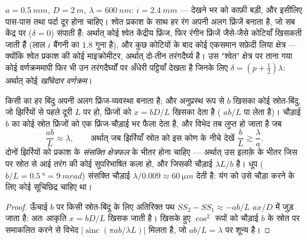 \begin{example}[आँकड़े, और श्वेत प्रकाश]\label{ex:b2:two-wave-interference:numbers}
$a = \qty{0.5}{mm}$, $D = \qty{2}{m}$, $\lambda = \qty{600}{nm}$: $i = \qty{2.4}{mm}$ --- देखने भर
को काफ़ी बड़ी, और इसीलिए  पास-पास तथा पर्दा
दूर होना चाहिए। श्वेत प्रकाश के साथ हर रंग अपनी अलग फ्रिंजें बनाता है, जो सब
केंद्र पर ($\delta = 0$) संपाती हैं: अर्थात् कोई श्वेत केंद्रीय फ्रिंज, फिर
रंगीन फ्रिंजें जैसे-जैसे कोटियाँ खिसकती जाती हैं (लाल $i$ बैंगनी का $1.8$ गुना
है), और कुछ कोटियों के बाद कोई एकसमान सफ़ेदी लिया क्षेत्र --- क्योंकि
श्वेत प्रकाश की  कोई माइक्रोमीटर, अर्थात् दो-तीन
तरंगदैर्घ्य है। उस "श्वेत" क्षेत्र पर ताना गया कोई वर्णक्रममापी फिर भी
उन तरंगदैर्घ्यों पर अँधेरी पट्टियाँ देखता है जिनके लिए $\delta = (p + \tfrac12)\lambda$: अर्थात् कोई
\emph{खाँचेदार वर्णक्रम}।
\end{example}

\begin{proposition}[दैशिक संसक्ति: स्रोत छोटा होना चाहिए]\label{prop:b2:two-wave-interference:spatial}
किसी  का हर बिंदु अपनी अलग फ्रिंज-व्यवस्था बनाता है; और
अनुप्रस्थ रूप से $b$ खिसका कोई स्रोत-बिंदु, जो झिर्रियों से पहले दूरी $L$ पर हो,
फ्रिंजों को $x = bD/L$ खिसका देता है (
$ab/L$ पा लेता है)। चौड़ाई $b$ का कोई स्रोत फ्रिंजों को एक फ्रिंज-चौड़ाई भर फैला देता है,
और विभेद तब लुप्त हो जाता है जब
\[
\frac{ab}L \approx \lambda , \qquad\text{अर्थात् जब झिर्रियाँ स्रोत को इस कोण के नीचे देखें } \frac bL \gtrsim \frac\lambda a .
\]
दोनों झिर्रियों को प्रकाश के \emph{संसक्ति क्षेत्रफल} के भीतर होना चाहिए ---
अर्थात् उस इलाक़े के भीतर जिस पर स्रोत से आई तरंग की कोई सुपरिभाषित
कला हो, और जिसकी चौड़ाई $\lambda L/b$ है। धूप ($b/L = \qty{0.5}{\degree} = \qty{9}{mrad}$)
संसक्ति चौड़ाई $\lambda/0.009 \approx \qty{60}{\micro m}$ देती है: यंग को उसे चौड़ा करने के लिए कोई
सूचिछिद्र चाहिए था।
\end{proposition}

\begin{proof}
ऊँचाई $b$ पर किसी स्रोत-बिंदु के लिए अतिरिक्त पथ $SS_2 - SS_1 \approx -ab/L$
$ax/D$ में जुड़ जाता है: अतः आकृति $x = bD/L$ खिसक जाती है। खिसके हुए
$\cos^2$ रूपों को चौड़ाई $b$ के स्रोत पर समाकलित करने से विभेद
$|\operatorname{sinc}(\pi ab/\lambda L)|$ मिलता है, जो $ab/L = \lambda$ पर शून्य है।
\end{proof}

